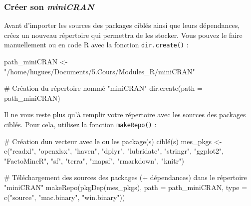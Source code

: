 \documentclass[
  letterpaper,
  DIV=11,
  numbers=noendperiod]{scrartcl}
\newenvironment{Shaded}{\begin{snugshade}}{\end{snugshade}}
\newcommand{\AttributeTok}[1]{\textcolor[rgb]{0.40,0.45,0.13}{#1}}
\newcommand{\CommentTok}[1]{\textcolor[rgb]{0.37,0.37,0.37}{#1}}
\newcommand{\FunctionTok}[1]{\textcolor[rgb]{0.28,0.35,0.67}{#1}}
\newcommand{\NormalTok}[1]{\textcolor[rgb]{0.00,0.23,0.31}{#1}}
\newcommand{\OtherTok}[1]{\textcolor[rgb]{0.00,0.23,0.31}{#1}}
\newcommand{\StringTok}[1]{\textcolor[rgb]{0.13,0.47,0.30}{#1}}
\begin{document}
\hypertarget{cruxe9er-son-minicran}{%
\subsubsection{\texorpdfstring{Créer son
\emph{miniCRAN}}{Créer son miniCRAN}}\label{cruxe9er-son-minicran}}

Avant d'importer les sources des packages ciblés ainsi que leurs
dépendances, créez un nouveau répertoire qui permettra de les stocker.
Vous pouvez le faire manuellement ou en code R avec la fonction
\texttt{dir.create()} :

\begin{Shaded}
\begin{Highlighting}[]
\NormalTok{path\_miniCRAN }\OtherTok{\textless{}{-}} \StringTok{"/home/hugues/Documents/5.Cours/Modules\_R/miniCRAN"}

\CommentTok{\# Création du répertoire nommé "miniCRAN"}
\FunctionTok{dir.create}\NormalTok{(}\AttributeTok{path =}\NormalTok{ path\_miniCRAN)}
\end{Highlighting}
\end{Shaded}

Il ne vous reste plus qu'à remplir votre répertoire avec les sources des
packages ciblés. Pour cela, utilisez la fonction \texttt{makeRepo()} :

\begin{Shaded}
\begin{Highlighting}[]
\CommentTok{\# Création d\textquotesingle{}un vecteur avec le ou les package(s) ciblé(s)}
\NormalTok{mes\_pkgs }\OtherTok{\textless{}{-}} \FunctionTok{c}\NormalTok{(}\StringTok{"readxl"}\NormalTok{, }\StringTok{"openxlsx"}\NormalTok{, }\StringTok{"haven"}\NormalTok{,}
              \StringTok{"dplyr"}\NormalTok{, }\StringTok{"lubridate"}\NormalTok{, }\StringTok{"stringr"}\NormalTok{,}
              \StringTok{"ggplot2"}\NormalTok{, }\StringTok{"FactoMineR"}\NormalTok{, }\StringTok{"sf"}\NormalTok{,}
              \StringTok{"terra"}\NormalTok{, }\StringTok{"mapsf"}\NormalTok{, }\StringTok{"rmarkdown"}\NormalTok{, }\StringTok{"knitr"}\NormalTok{)}


\CommentTok{\# Téléchargement des sources des packages (+ dépendances) dans le répertoire "miniCRAN"}
\FunctionTok{makeRepo}\NormalTok{(}\FunctionTok{pkgDep}\NormalTok{(mes\_pkgs), }\AttributeTok{path =}\NormalTok{ path\_miniCRAN, }\AttributeTok{type =} \FunctionTok{c}\NormalTok{(}\StringTok{"source"}\NormalTok{, }\StringTok{"mac.binary"}\NormalTok{, }\StringTok{"win.binary"}\NormalTok{))}
\end{Highlighting}
\end{Shaded}
\end{document}
